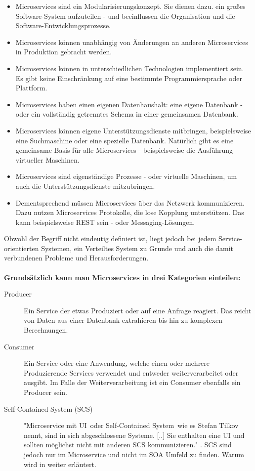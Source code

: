 \begin{itemize}
    \item Microservices sind ein Modularisierungskonzept. Sie dienen dazu. ein großes Software-System aufzuteilen - und beeinflussen die Organisation und die Software-Entwicklungsprozesse.
    \item Microservices können unabhängig von Änderungen an anderen Microservices in Produktion gebracht werden.
    \item Microservices können in unterschiedlichen Technologien implementiert sein. Es gibt keine Einschränkung auf eine bestimmte Programmiersprache oder Plattform.
    \item Microservices haben einen eigenen Datenhaushalt: eine eigene Datenbank - oder ein vollständig getrenntes Schema in einer gemeinsamen Datenbank.
    \item Microservices können eigene Unterstützungsdienste mitbringen, beispielsweise eine Suchmaschine oder eine spezielle Datenbank. Natürlich gibt es eine gemeinsame Basis für alle Microservices - beispielsweise die Ausführung virtueller Maschinen.
    \item Microservices sind eigenständige Prozesse - oder virtuelle Maschinen, um auch die Unterstützungsdienste mitzubringen.
    \item Dementsprechend müssen Microservices über das Netzwerk kommunizieren. Dazu nutzen Microservices Protokolle, die lose Kopplung unterstützen. Das kann beispielsweise REST sein - oder Messaging-Lösungen.
\end{itemize}
Obwohl der Begriff nicht eindeutig definiert ist, liegt jedoch bei jedem Service-orientierten Systemen, ein Verteiltes System zu Grunde und auch die damit verbundenen Probleme und Herausforderungen.
\\\\
\textbf{Grundsätzlich kann man Microservices in drei Kategorien einteilen:}
\begin{description}
    \item[Producer] Ein Service der etwas Produziert oder auf eine Anfrage reagiert. Das reicht von Daten aus einer Datenbank extrahieren bis hin zu komplexen Berechnungen.
    \item[Consumer] Ein Service oder eine Anwendung, welche einen oder mehrere Produzierende Services verwendet und entweder weiterverarbeitet oder ausgibt. Im Falle der Weiterverarbeitung ist ein Consumer ebenfalls ein Producer sein.
    \item[Self-Contained System (SCS)] "\frqq Microservice mit UI\flqq\ oder \frqq Self-Contained System\flqq\ wie es Stefan Tilkov nennt, sind in sich abgeschlossene Systeme. [..] Sie enthalten eine UI und sollten möglichst nicht mit anderen SCS kommunizieren." \cite[vgl S. 55]{EWolff2016:Microservices}. SCS sind jedoch nur im Microservice und nicht im SOA Umfeld zu finden. Warum wird in  weiter erläutert.
\end{description}

